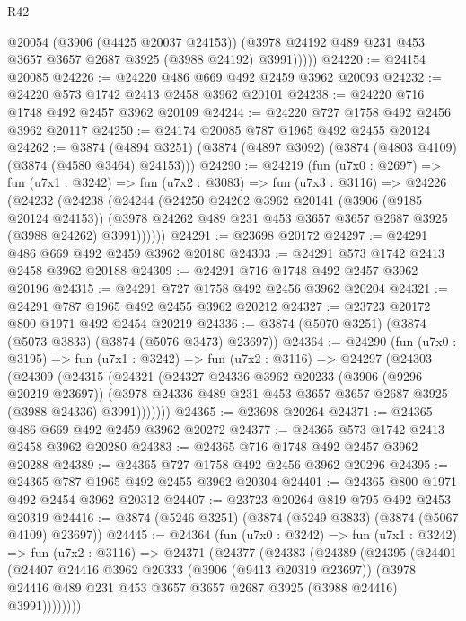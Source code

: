 \begin{lexlean}{R42}
\begin{coremodule}
            @20054
            (@3906 (@4425 @20037 @24153))
            (@3978 @24192 @489 @231 @453 @3657 @3657 @2687 @3925 (@3988 @24192) @3991)))))
@24220 := @24154 @20085
@24226 := @24220 @486 @669 @492 @2459 @3962 @20093
@24232 := @24220 @573 @1742 @2413 @2458 @3962 @20101
@24238 := @24220 @716 @1748 @492 @2457 @3962 @20109
@24244 := @24220 @727 @1758 @492 @2456 @3962 @20117
@24250 := @24174 @20085 @787 @1965 @492 @2455 @20124
@24262 := @3874
    (@4894 @3251)
    (@3874 (@4897 @3092) (@3874 (@4803 @4109) (@3874 (@4580 @3464) @24153)))
@24290 := @24219
    (fun (u7x0 : @2697) =>
    fun (u7x1 : @3242) =>
    fun (u7x2 : @3083) =>
    fun (u7x3 : @3116) =>
    @24226
      (@24232
        (@24238
          (@24244
            (@24250
              @24262
              @3962
              @20141
              (@3906 (@9185 @20124 @24153))
              (@3978 @24262 @489 @231 @453 @3657 @3657 @2687 @3925 (@3988 @24262) @3991))))))
@24291 := @23698 @20172
@24297 := @24291 @486 @669 @492 @2459 @3962 @20180
@24303 := @24291 @573 @1742 @2413 @2458 @3962 @20188
@24309 := @24291 @716 @1748 @492 @2457 @3962 @20196
@24315 := @24291 @727 @1758 @492 @2456 @3962 @20204
@24321 := @24291 @787 @1965 @492 @2455 @3962 @20212
@24327 := @23723 @20172 @800 @1971 @492 @2454 @20219
@24336 := @3874 (@5070 @3251) (@3874 (@5073 @3833) (@3874 (@5076 @3473) @23697))
@24364 := @24290
    (fun (u7x0 : @3195) =>
    fun (u7x1 : @3242) =>
    fun (u7x2 : @3116) =>
    @24297
      (@24303
        (@24309
          (@24315
            (@24321
              (@24327
                @24336
                @3962
                @20233
                (@3906 (@9296 @20219 @23697))
                (@3978 @24336 @489 @231 @453 @3657 @3657 @2687 @3925 (@3988 @24336) @3991)))))))
@24365 := @23698 @20264
@24371 := @24365 @486 @669 @492 @2459 @3962 @20272
@24377 := @24365 @573 @1742 @2413 @2458 @3962 @20280
@24383 := @24365 @716 @1748 @492 @2457 @3962 @20288
@24389 := @24365 @727 @1758 @492 @2456 @3962 @20296
@24395 := @24365 @787 @1965 @492 @2455 @3962 @20304
@24401 := @24365 @800 @1971 @492 @2454 @3962 @20312
@24407 := @23723 @20264 @819 @795 @492 @2453 @20319
@24416 := @3874 (@5246 @3251) (@3874 (@5249 @3833) (@3874 (@5067 @4109) @23697))
@24445 := @24364
    (fun (u7x0 : @3242) =>
    fun (u7x1 : @3242) =>
    fun (u7x2 : @3116) =>
    @24371
      (@24377
        (@24383
          (@24389
            (@24395
              (@24401
                (@24407
                  @24416
                  @3962
                  @20333
                  (@3906 (@9413 @20319 @23697))
                  (@3978 @24416 @489 @231 @453 @3657 @3657 @2687 @3925 (@3988 @24416) @3991))))))))

\end{coremodule}
\end{lexlean}
